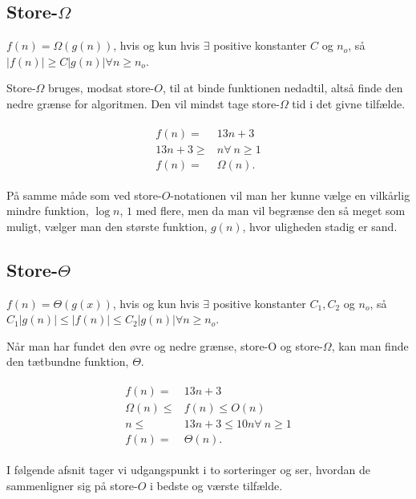 \subsection{Store-$\Omega$}
\begin{defn}
$f(n) = \Omega(g(n))$, hvis og kun hvis $\exists$ positive konstanter $C$ og $n_o$, så $|f(n)| \geq C |g(n)| \forall n \geq n_o$.
\end{defn}
Store-$\Omega$ bruges, modsat store-$O$, til at binde funktionen nedadtil, altså finde den nedre grænse for algoritmen. Den vil mindst tage store-$\Omega$ tid i det givne tilfælde.
\begin{exmp}
\begin{align}
\begin{split}
f(n)=& 13n+3 \\
13n+3 \geq& n \forall \ n \geq 1 \\
f(n) =& \Omega(n).
\end{split}
\end{align}
\end{exmp}

På samme måde som ved store-$O$-notationen vil man her kunne vælge en vilkårlig mindre funktion, $\log n$, $1$ med flere, men da man vil begrænse den så meget som muligt, vælger man den største funktion, $g(n)$, hvor uligheden stadig er sand.
\subsection{Store-$\Theta$}
\begin{defn}
$f(n) = \Theta(g(x))$, hvis og kun hvis $\exists$ positive konstanter $C_1, C_2$ og $n_o$, så $C_1|g(n)| \leq |f(n)| \leq C_2|g(n)| \forall n \geq n_o$.
\end{defn}
Når man har fundet den øvre og nedre grænse, store-O og store-$\Omega$, kan man finde den tætbundne funktion, $\Theta$.
\begin{exmp}
\begin{align}
\begin{split}
f(n)=& 13n+3 \\
\Omega(n) \leq& f(n) \leq O(n) \\
n \leq& 13n+3 \leq 10n \forall \ n \geq 1 \\
f(n) =& \Theta(n).
\end{split}
\end{align}
\end{exmp}

I følgende afsnit tager vi udgangspunkt i to sorteringer og ser, hvordan de sammenligner sig på store-$O$ i bedste og værste tilfælde.

